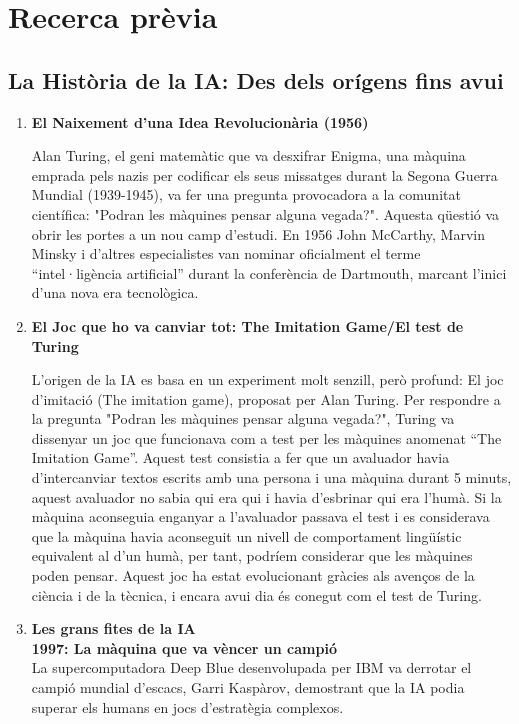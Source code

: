 \chapter{Recerca prèvia}
\label{c:recerca prèvia}

\section{La Història de la IA: Des dels orígens fins avui}
\begin{enumerate}
    \item \textbf{El Naixement d'una Idea Revolucionària (1956)}

    Alan Turing, el geni matemàtic que va desxifrar Enigma, una màquina emprada pels nazis per codificar els seus missatges durant la Segona Guerra Mundial (1939-1945), va fer una pregunta provocadora a la comunitat científica: "Podran les màquines pensar alguna vegada?". Aquesta qüestió va obrir les portes a un nou camp d'estudi. En 1956 John McCarthy, Marvin Minsky i d'altres especialistes van nominar oficialment el terme ``intel·ligència artificial'' durant la conferència de Dartmouth, marcant l'inici d'una nova era tecnològica.

    \item \textbf{El Joc que ho va canviar tot: The Imitation Game/El test de Turing}

    L'origen de la IA es basa en un experiment molt senzill, però profund: El joc d'imitació (The imitation game), proposat per Alan Turing. Per respondre a la pregunta "Podran les màquines pensar alguna vegada?", Turing va dissenyar un joc que funcionava com a test per les màquines anomenat ``The Imitation Game''. Aquest test consistia a fer que un avaluador havia d'intercanviar textos escrits amb una persona i una màquina durant 5 minuts, aquest avaluador no sabia qui era qui i havia d'esbrinar qui era l'humà. Si la màquina aconseguia enganyar a l'avaluador passava el test i es considerava que la màquina havia aconseguit un nivell de comportament lingüístic equivalent al d'un humà, per tant, podríem considerar que les màquines poden pensar. Aquest joc ha estat evolucionant gràcies als avenços de la ciència i de la tècnica, i encara avui dia és conegut com el test de Turing.

    \item \textbf{Les grans fites de la IA}\\
    \textbf{1997: La màquina que va vèncer un campió}\\
    La supercomputadora Deep Blue desenvolupada per IBM va derrotar el campió mundial d'escacs, Garri Kaspàrov, demostrant que la IA podia superar els humans en jocs d'estratègia complexos.


\end{enumerate}
